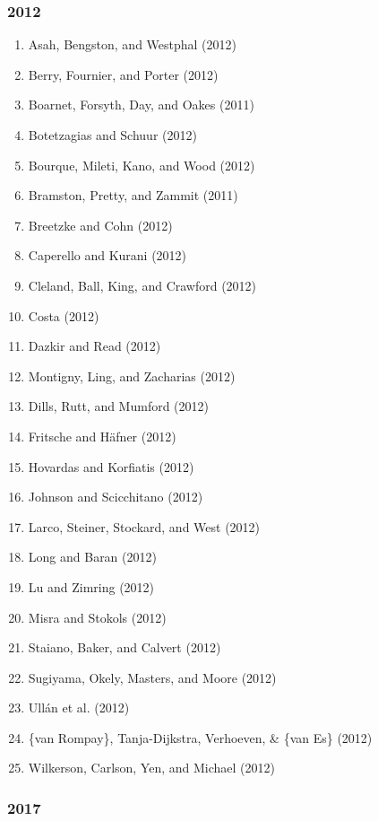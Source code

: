\documentclass[english,man]{apa6}
\providecommand{\tightlist}{%
  \setlength{\itemsep}{0pt}\setlength{\parskip}{0pt}}
\theoremstyle{definition}
\theoremstyle{definition}
\theoremstyle{definition}
\theoremstyle{remark}
\begin{document}
\subsubsection{2012}\label{section-20}

\begin{enumerate}
\def\labelenumi{\arabic{enumi})}
\tightlist
\item
  Asah, Bengston, and Westphal (2012)
\item
  Berry, Fournier, and Porter (2012)
\item
  Boarnet, Forsyth, Day, and Oakes (2011)
\item
  Botetzagias and Schuur (2012)
\item
  Bourque, Mileti, Kano, and Wood (2012)
\item
  Bramston, Pretty, and Zammit (2011)
\item
  Breetzke and Cohn (2012)
\item
  Caperello and Kurani (2012)
\item
  Cleland, Ball, King, and Crawford (2012)
\item
  Costa (2012)
\item
  Dazkir and Read (2012)
\item
  Montigny, Ling, and Zacharias (2012)
\item
  Dills, Rutt, and Mumford (2012)
\item
  Fritsche and Häfner (2012)
\item
  Hovardas and Korfiatis (2012)
\item
  Johnson and Scicchitano (2012)
\item
  Larco, Steiner, Stockard, and West (2012)
\item
  Long and Baran (2012)
\item
  Lu and Zimring (2012)
\item
  Misra and Stokols (2012)
\item
  Staiano, Baker, and Calvert (2012)
\item
  Sugiyama, Okely, Masters, and Moore (2012)
\item
  Ullán et al. (2012)
\item
  {\{}van Rompay\}, Tanja-Dijkstra, Verhoeven, \& \{van Es\} (2012)
\item
  Wilkerson, Carlson, Yen, and Michael (2012)
\end{enumerate}

\subsubsection{2017}\label{section-21}
\end{document}
